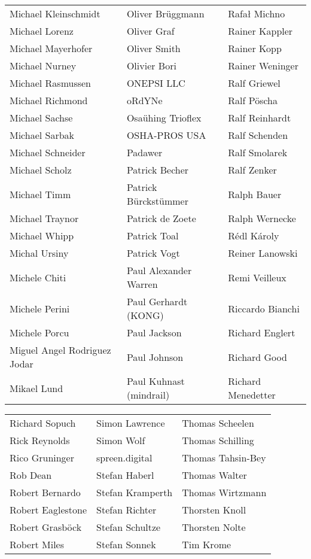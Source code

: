 \begin{small}
\begin{tabular}{p{4cm}p{4cm}p{4cm}}
Michael Kleinschmidt & Oliver Brüggmann & Rafał Michno \\
Michael Lorenz & Oliver Graf & Rainer Kappler \\
Michael Mayerhofer & Oliver Smith & Rainer Kopp \\
Michael Nurney & Olivier Bori & Rainer Weninger \\
Michael Rasmussen & ONEPSI LLC & Ralf Griewel \\
Michael Richmond & oRdYNe & Ralf Pöscha \\
Michael Sachse & Osaühing Trioflex & Ralf Reinhardt \\
Michael Sarbak & OSHA-PROS USA & Ralf Schenden \\
Michael Schneider & Padawer & Ralf Smolarek \\
Michael Scholz & Patrick Becher & Ralf Zenker \\
Michael Timm & Patrick Bürckstümmer & Ralph Bauer \\
Michael Traynor & Patrick de Zoete & Ralph Wernecke \\
Michael Whipp & Patrick Toal & Rédl Károly \\
Michal Ursiny & Patrick Vogt & Reiner Lanowski \\
Michele Chiti & Paul Alexander Warren & Remi Veilleux \\
Michele Perini & Paul Gerhardt (KONG) & Riccardo Bianchi \\
Michele Porcu & Paul Jackson & Richard Englert \\
Miguel Angel Rodriguez Jodar & Paul Johnson & Richard Good \\
Mikael Lund & Paul Kuhnast (mindrail) & Richard Menedetter \\
\end{tabular}
\newpage
\setlength{\tabcolsep}{1mm}
\begin{tabular}{p{4cm}p{4cm}p{4cm}}
Richard Sopuch & Simon Lawrence & Thomas Scheelen \\
Rick Reynolds & Simon Wolf & Thomas Schilling \\
Rico Gruninger & spreen.digital & Thomas Tahsin-Bey \\
Rob Dean & Stefan Haberl & Thomas Walter \\
Robert Bernardo & Stefan Kramperth & Thomas Wirtzmann \\
Robert Eaglestone & Stefan Richter & Thorsten Knoll \\
Robert Grasböck & Stefan Schultze & Thorsten Nolte \\
Robert Miles & Stefan Sonnek & Tim Krome \\

\end{tabular}
\end{small}

